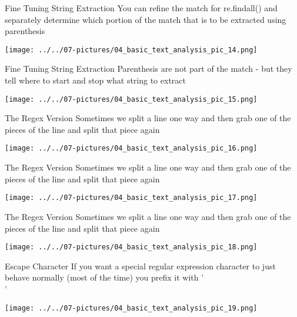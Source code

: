 \documentclass[11pt]{beamer}
\begin{document}
\begin{frame}{Fine Tuning String Extraction}
	You can refine the match for re.findall() and separately determine which portion of the match that is to be extracted using parenthesis
	\begin{center}
	\texttt{[image: ../../07-pictures/04\_basic\_text\_analysis\_pic\_14.png]}
	\end{center}
\end{frame}
\begin{frame}{Fine Tuning String Extraction}
	Parenthesis are not part of the match - but they tell where to start and stop what string to extract
	\begin{center}
	\texttt{[image: ../../07-pictures/04\_basic\_text\_analysis\_pic\_15.png]}
	\end{center}
\end{frame}
\begin{frame}{The Regex Version}
	Sometimes we split a line one way and then grab one of the pieces of the line and split that piece again
	\begin{center}
	\texttt{[image: ../../07-pictures/04\_basic\_text\_analysis\_pic\_16.png]}
	\end{center}
\end{frame}
\begin{frame}{The Regex Version}
	Sometimes we split a line one way and then grab one of the pieces of the line and split that piece again
	\begin{center}
	\texttt{[image: ../../07-pictures/04\_basic\_text\_analysis\_pic\_17.png]}
	\end{center}
\end{frame}
\begin{frame}{The Regex Version}
	Sometimes we split a line one way and then grab one of the pieces of the line and split that piece again
	\begin{center}
	\texttt{[image: ../../07-pictures/04\_basic\_text\_analysis\_pic\_18.png]}
	\end{center}
\end{frame}
\begin{frame}{Escape Character}
	If you want a special regular expression character to just behave normally (most of the time) you prefix it with ' \\'
	\begin{center}
	\texttt{[image: ../../07-pictures/04\_basic\_text\_analysis\_pic\_19.png]}
	\end{center}
\end{frame}
\end{document}

